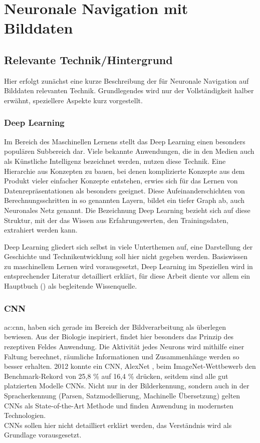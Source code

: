 
%
\chapter{Neuronale Navigation mit Bilddaten}

\section{Relevante Technik/Hintergrund}
Hier erfolgt zunächst eine kurze Beschreibung der für Neuronale Navigation auf Bilddaten relevanten Technik. Grundlegendes wird nur der Vollständigkeit halber erwähnt, speziellere Aspekte kurz vorgestellt. 

\subsection{Deep Learning}
Im Bereich des Maschinellen Lernens stellt das Deep Learning einen besonders populären Subbereich dar. Viele bekannte Anwendungen, die in den Medien auch als Künstliche Intelligenz bezeichnet werden, nutzen diese Technik. Eine Hierarchie aus Konzepten zu bauen, bei denen komplizierte Konzepte aus dem Produkt vieler einfacher Konzepte entstehen, erwies sich für das Lernen von Datenrepräsentationen als besonders geeignet. Diese Aufeinanderschichten von Berechnungsschritten in so genannten Layern, bildet ein tiefer Graph ab, auch Neuronales Netz genannt. Die Bezeichnung Deep Learning bezieht sich auf diese Struktur, mit der das Wissen aus Erfahrungswerten, den Trainingsdaten, extrahiert werden kann.

Deep Learning gliedert sich selbst in viele Unterthemen auf, eine Darstellung der Geschichte und Technikentwicklung soll hier nicht gegeben werden. Basiswissen zu maschinellem Lernen wird vorausgesetzt, Deep Learning im Speziellen wird in entsprechender Literatur detailliert erklärt, für diese Arbeit diente vor allem ein Hauptbuch (\cite{Goodfellow-et-al-2016}) als begleitende Wissenquelle.


\subsection{CNN}
\gls{ac:cnn}, haben sich gerade im Bereich der Bildverarbeitung als überlegen bewiesen. Aus der Biologie inspiriert, findet hier besonders das Prinzip des rezeptiven Feldes Anwendung. Die Aktivität jedes Neurons wird mithilfe einer Faltung berechnet, räumliche Informationen und Zusammenhänge werden so besser erhalten. 2012 konnte ein CNN, AlexNet \cite{krizhevsky2012imagenet}, beim ImageNet-Wettbewerb den Benchmark-Rekord von 25,8 \% auf 16,4 \% drücken, seitdem sind alle gut platzierten Modelle CNNs. Nicht nur in der Bilderkennung, sondern auch in der Spracherkennung (Parsen, Satzmodellierung, Machinelle Übersetzung) gelten CNNs als State-of-the-Art Methode und finden Anwendung in modernsten Technologien.\\
CNNs sollen hier nicht detailliert erklärt werden, das Verständnis wird als Grundlage vorausgesetzt.

